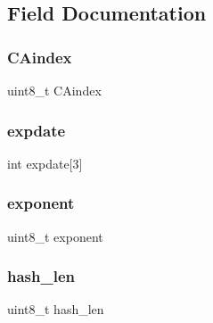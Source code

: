 \subsection{Field Documentation}
\hypertarget{struct_certification_authorities_a9414fe6ffc23bcd6aecf04b73815de4c}{}\label{struct_certification_authorities_a9414fe6ffc23bcd6aecf04b73815de4c} 
\subsubsection{\texorpdfstring{C\+Aindex}{CAindex}}
{\footnotesize\ttfamily uint8\+\_\+t C\+Aindex}

\hypertarget{struct_certification_authorities_a74db2d4c720927689793d17e8f7aa201}{}\label{struct_certification_authorities_a74db2d4c720927689793d17e8f7aa201} 
\subsubsection{\texorpdfstring{expdate}{expdate}}
{\footnotesize\ttfamily int expdate\mbox{[}3\mbox{]}}

\hypertarget{struct_certification_authorities_af05d5abe7656953548edfb3eb5117659}{}\label{struct_certification_authorities_af05d5abe7656953548edfb3eb5117659} 
\subsubsection{\texorpdfstring{exponent}{exponent}}
{\footnotesize\ttfamily uint8\+\_\+t exponent}

\hypertarget{struct_certification_authorities_a759b7e96d51c83032b1b2b3b044c603b}{}\label{struct_certification_authorities_a759b7e96d51c83032b1b2b3b044c603b} 
\subsubsection{\texorpdfstring{hash\+\_\+len}{hash\_len}}
{\footnotesize\ttfamily uint8\+\_\+t hash\+\_\+len}

